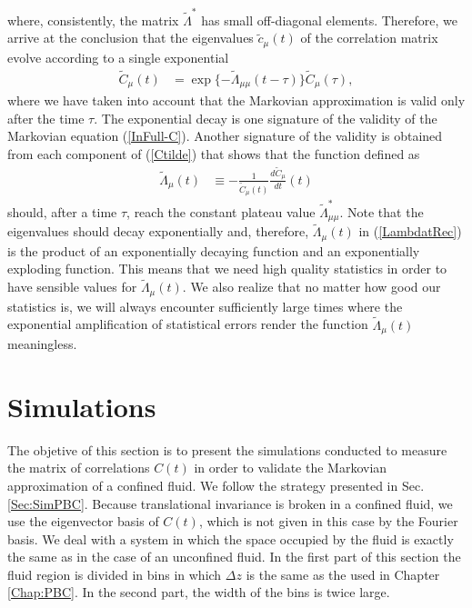\documentclass[b5paper,openright,10pt]{book}
\begin{document}
where,   consistently,  the   matrix  $\tilde{\Lambda}^*$   has  small
off-diagonal elements.   Therefore, we  arrive at the  conclusion that
the eigenvalues  $\tilde{c}_\mu(t)$ of  the correlation  matrix evolve
according to a single exponential
\begin{align}
  \tilde{C}_\mu(t)&=\exp\{-\tilde{\Lambda}_{\mu\mu} (t-\tau)\}  \tilde{C}_\mu(\tau),
\end{align}
where we have  taken into account that the  Markovian approximation is
valid  only  after the  time  $\tau$.  The  exponential decay  is  one
signature    of   the    validity    of    the   Markovian    equation
(\ref{InFull-C}). Another  signature of the validity  is obtained from
each component of (\ref{Ctilde}) that  shows that the function defined
as
\begin{align}
  \tilde{\Lambda}_{\mu}(t)&\equiv -\frac{1}{{\tilde{C}}_{\mu}(t)}\frac{d{\tilde{C}}_{\mu}}{dt}(t)
\label{LambdatRec}
\end{align}
should,  after  a time  $\tau$,  reach  the  constant plateau  value  $
\tilde{\Lambda}_{\mu\mu}^*$.  Note  that the eigenvalues  should decay
exponentially  and,  therefore,  $  \tilde{\Lambda}_{\mu}(t)$ in (\ref{LambdatRec}) is  the
product  of an  exponentially decaying  function and  an exponentially
exploding function. This means that we need high quality statistics in
order  to have  sensible values  for $  \tilde{\Lambda}_{\mu}(t)$.  We
also realize that no matter how good our statistics is, we will always
encounter sufficiently large times where the exponential amplification
of statistical errors render  the function $ \tilde{\Lambda}_{\mu}(t)$
meaningless.


\section{Simulations}
\label{Sec:SimWALLS}
The objetive of this section is to present the simulations conducted to measure the matrix of correlations $C(t)$ in order to validate the Markovian approximation of a confined fluid. 
We follow the strategy presented in Sec. \ref{Sec:SimPBC}. Because translational invariance is broken in a confined fluid, we use the eigenvector basis of $C(t)$, which is not given in this case by the Fourier basis.
We deal with a system in which the space occupied by the fluid is exactly the same as in the case of an unconfined fluid. In the first part of this section the fluid region is divided in bins in which $\Delta z$ is the same as the used in Chapter \ref{Chap:PBC}. In the second part, the width of the bins is twice large. 
\end{document}
